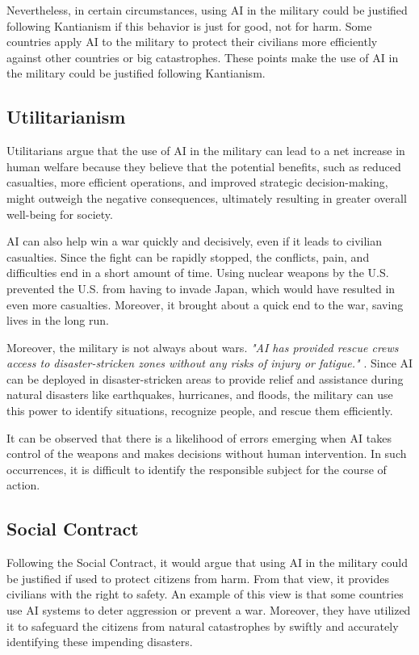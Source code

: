 \documentclass[12pt]{article}
\begin{document}
Nevertheless, in certain circumstances, using AI in the military could be justified following Kantianism if this behavior is just for good, not for harm. Some countries apply AI to the military to protect their civilians more efficiently against other countries or big catastrophes. These points make the use of AI in the military could be justified following Kantianism.  

\subsection{Utilitarianism}
Utilitarians argue that the use of AI in the military can lead to a net increase in human welfare because they believe that the potential benefits, such as reduced casualties, more efficient operations, and improved strategic decision-making, might outweigh the negative consequences, ultimately resulting in greater overall well-being for society.

AI can also help win a war quickly and decisively, even if it leads to civilian casualties. Since the fight can be rapidly stopped, the conflicts, pain, and difficulties end in a short amount of time. Using nuclear weapons by the U.S. prevented the U.S. from having to invade Japan, which would have resulted in even more casualties. Moreover, it brought about a quick end to the war, saving lives in the long run.

Moreover, the military is not always about wars. \textit{"AI has provided rescue crews access to disaster-stricken zones without any risks of injury or fatigue."} \cite{Sud2020}. Since AI can be deployed in disaster-stricken areas to provide relief and assistance during natural disasters like earthquakes, hurricanes, and floods, the military can use this power to identify situations, recognize people, and rescue them efficiently.

It can be observed that there is a likelihood of errors emerging when AI takes control of the weapons and makes decisions without human intervention. In such occurrences, it is difficult to identify the responsible subject for the course of action.

\subsection{Social Contract}
Following the Social Contract, it would argue that using AI in the military could be justified if used to protect citizens from harm. From that view, it provides civilians with the right to safety. An example of this view is that some countries use AI systems to deter aggression or prevent a war. Moreover, they have utilized it to safeguard the citizens from natural catastrophes by swiftly and accurately identifying these impending disasters.
\end{document}
